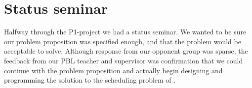 \section{Status seminar}
Halfway through the P1-project we had a status seminar. We wanted to be sure our problem proposition was specified enough, and that the problem would be acceptable to solve. Although response from our opponent group was sparse, the feedback from our PBL teacher and supervisor was confirmation that we could continue with the problem proposition and actually begin designing and programming the solution to the scheduling problem of \siemens. 